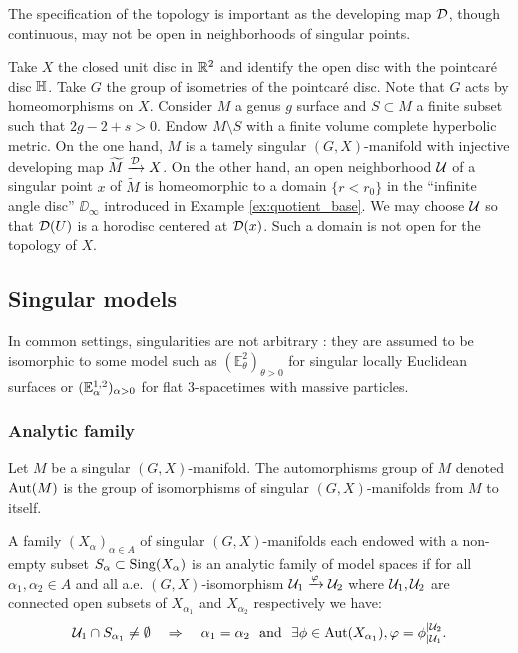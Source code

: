  The specification of the topology is important as the developing map $\mathcal{D}$, though continuous, may not be open in neighborhoods of singular points.
 \begin{ex}\label{ex:take_closed_unit_disc}
  Take $X$ the closed unit disc in $\mathbb R^2$ and identify the open disc with the pointcaré disc $\mathbb{H}$. Take $G$ the group of isometries of the pointcaré disc. Note that $G$ acts by homeomorphisms on $X$.
  Consider $M$ a genus $g$ surface and $S\subset M$ a finite subset such that $2g-2+s>0$. Endow $M\setminus S$ with a finite volume complete hyperbolic metric. 
  On the one hand, $M$ is a tamely singular $(G,X)$-manifold with injective developing map $\widetilde M \xrightarrow{\mathcal{D}} X$. On the other hand, an open neighborhood $\mathcal{U}$ of a singular point $x$ of $\widetilde M$ is homeomorphic to a domain $\{r<r_0\}$ in the  ``infinite angle disc'' $\DD_\infty$ introduced in Example \ref{ex:quotient_base}. We may choose $\mathcal{U}$ so that $\mathcal{D}(U)$ is a horodisc centered at $\mathcal{D}(x)$. Such a domain is not open for the topology of $X$.
  
  
 \end{ex}





\subsection{Singular models}

In common settings, singularities are not arbitrary : they are assumed to be isomorphic to some model such as $(\mathbb E^2_{\theta})_{\theta>0}$ for singular locally Euclidean surfaces or $(\mathbb{E}^{1,2}_\alpha)_{\alpha>0}$ for flat 3-spacetimes with massive particles.

\subsubsection{Analytic family}

\begin{defi}\label{def:singular_manifold_automorphisms_group}
 Let $M$ be a singular $(G,X)$-manifold. The automorphisms group of $M$ denoted $\mathrm{Aut}(M)$ is the group of isomorphisms of singular $(G,X)$-manifolds from $M$ to itself.
\end{defi}

\begin{defi}\label{def:family_singular_manifolds_endowed} A family $(X_\alpha)_{\alpha \in A}$ of singular $(G,X)$-manifolds each endowed with a non-empty subset $S_\alpha\subset \mathrm{Sing}(X_\alpha)$ is an analytic family of model spaces if for all $\alpha_1,\alpha_2\in A$ and all a.e. $(G,X)$-isomorphism $\mathcal{U}_1\xrightarrow{\varphi} \mathcal{U}_2$ where $\mathcal{U}_1,\mathcal{U}_2$ are connected open subsets of $X_{\alpha_1}$ and $X_{\alpha_2}$ respectively we have:
$$\mathcal{U}_1\cap S_{\alpha_1}\neq \emptyset \quad \Rightarrow \quad \alpha_1=\alpha_2 ~~\text{and}~~\exists \phi \in  \mathrm{Aut}(X_{\alpha_1}), \varphi=\phi_{|\mathcal{U}_1}^{|\mathcal{U}_2}.$$


\end{defi}

